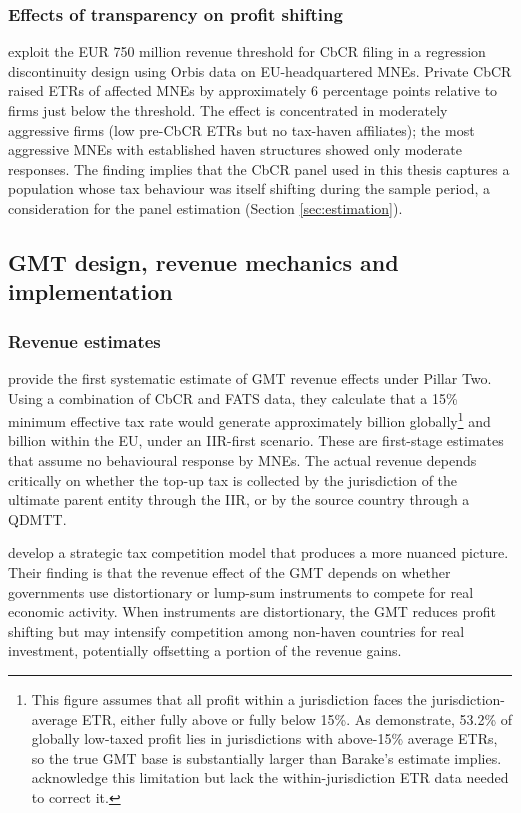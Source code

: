 \documentclass[11pt,a4paper]{article}
\newcommand{\EUR}{\texteuro}
\begin{document}
\subsubsection{Effects of transparency on profit shifting}

\citet{tuinsma2025} exploit the EUR 750 million revenue threshold for CbCR filing in a regression discontinuity design using Orbis data on EU-headquartered MNEs. Private CbCR raised ETRs of affected MNEs by approximately 6 percentage points relative to firms just below the threshold. The effect is concentrated in moderately aggressive firms (low pre-CbCR ETRs but no tax-haven affiliates); the most aggressive MNEs with established haven structures showed only moderate responses. The finding implies that the CbCR panel used in this thesis captures a population whose tax behaviour was itself shifting during the sample period, a consideration for the panel estimation (Section \ref{sec:estimation}).

\subsection{GMT design, revenue mechanics and implementation}\label{sec:design}

\subsubsection{Revenue estimates}

\citet{barake2022} provide the first systematic estimate of GMT revenue effects under Pillar Two. Using a combination of CbCR and FATS data, they calculate that a 15\% minimum effective tax rate would generate approximately \EUR 179 billion globally\footnote{This figure assumes that all profit within a jurisdiction faces the jurisdiction-average ETR, either fully above or fully below 15\%. As \citet{hugger2026} demonstrate, 53.2\% of globally low-taxed profit lies in jurisdictions with above-15\% average ETRs, so the true GMT base is substantially larger than Barake's estimate implies. \citet{barake2022} acknowledge this limitation but lack the within-jurisdiction ETR data needed to correct it.} and \EUR 55 billion within the EU, under an IIR-first scenario. These are first-stage estimates that assume no behavioural response by MNEs. The actual revenue depends critically on whether the top-up tax is collected by the jurisdiction of the ultimate parent entity through the IIR, or by the source country through a QDMTT.

\citet{janeba2023} develop a strategic tax competition model that produces a more nuanced picture. Their finding is that the revenue effect of the GMT depends on whether governments use distortionary or lump-sum instruments to compete for real economic activity. When instruments are distortionary, the GMT reduces profit shifting but may intensify competition among non-haven countries for real investment, potentially offsetting a portion of the revenue gains.
\end{document}
